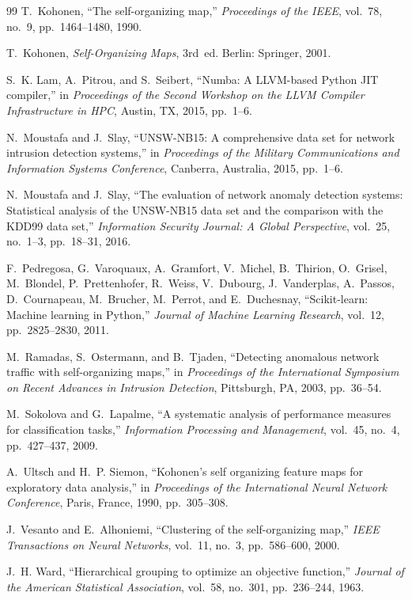 \documentclass[conference,10pt]{IEEEtran}
\begin{document}
\begin{thebibliography}{99}
T.~Kohonen, ``The self-organizing map,'' \emph{Proceedings of the IEEE}, vol.~78, no.~9, pp.~1464--1480, 1990.

T.~Kohonen, \emph{Self-Organizing Maps}, 3rd~ed. Berlin: Springer, 2001.

S.~K. Lam, A.~Pitrou, and S.~Seibert, ``Numba: A LLVM-based Python JIT compiler,'' in \emph{Proceedings of the Second Workshop on the LLVM Compiler Infrastructure in HPC}, Austin, TX, 2015, pp.~1--6.

N.~Moustafa and J.~Slay, ``UNSW-NB15: A comprehensive data set for network intrusion detection systems,'' in \emph{Proceedings of the Military Communications and Information Systems Conference}, Canberra, Australia, 2015, pp.~1--6.

N.~Moustafa and J.~Slay, ``The evaluation of network anomaly detection systems: Statistical analysis of the UNSW-NB15 data set and the comparison with the KDD99 data set,'' \emph{Information Security Journal: A Global Perspective}, vol.~25, no.~1--3, pp.~18--31, 2016.

F.~Pedregosa, G.~Varoquaux, A.~Gramfort, V.~Michel, B.~Thirion, O.~Grisel, M.~Blondel, P.~Prettenhofer, R.~Weiss, V.~Dubourg, J.~Vanderplas, A.~Passos, D.~Cournapeau, M.~Brucher, M.~Perrot, and E.~Duchesnay, ``Scikit-learn: Machine learning in Python,'' \emph{Journal of Machine Learning Research}, vol.~12, pp.~2825--2830, 2011.

M.~Ramadas, S.~Ostermann, and B.~Tjaden, ``Detecting anomalous network traffic with self-organizing maps,'' in \emph{Proceedings of the International Symposium on Recent Advances in Intrusion Detection}, Pittsburgh, PA, 2003, pp.~36--54.

M.~Sokolova and G.~Lapalme, ``A systematic analysis of performance measures for classification tasks,'' \emph{Information Processing and Management}, vol.~45, no.~4, pp.~427--437, 2009.

A.~Ultsch and H.~P. Siemon, ``Kohonen's self organizing feature maps for exploratory data analysis,'' in \emph{Proceedings of the International Neural Network Conference}, Paris, France, 1990, pp.~305--308.

J.~Vesanto and E.~Alhoniemi, ``Clustering of the self-organizing map,'' \emph{IEEE Transactions on Neural Networks}, vol.~11, no.~3, pp.~586--600, 2000.

J.~H. Ward, ``Hierarchical grouping to optimize an objective function,'' \emph{Journal of the American Statistical Association}, vol.~58, no.~301, pp.~236--244, 1963.
\end{thebibliography}
\end{document}
